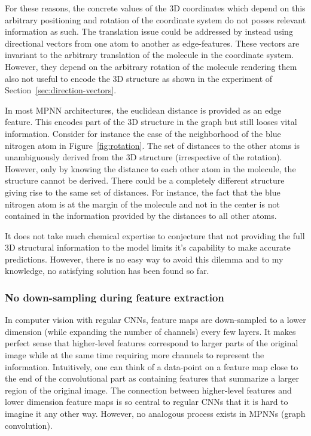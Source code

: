 For these reasons, the concrete values of the 3D coordinates which depend on this arbitrary positioning and rotation of the coordinate system do not posses relevant information as such. The translation issue could be addressed by instead using directional vectors from one atom to another as edge-features. These vectors are invariant to the arbitrary translation of the molecule in the coordinate system. However, they depend on the arbitrary rotation of the molecule rendering them also not useful to encode the 3D structure as shown in the experiment of Section~\ref{sec:direction-vectors}.

In most MPNN architectures, the euclidean distance is provided as an edge feature. This encodes part of the 3D structure in the graph but still looses vital information. Consider for instance the case of the neighborhood of the blue nitrogen atom in Figure~\ref{fig:rotation}. The set of distances to the other atoms is unambiguously derived from the 3D structure (irrespective of the rotation). However, only by knowing the distance to each other atom in the molecule, the structure cannot be derived. There could be a completely different structure giving rise to the same set of distances. For instance, the fact that the blue nitrogen atom is at the margin of the molecule and not in the center is not contained in the information provided by the distances to all other atoms.


It does not take much chemical expertise to conjecture that not providing the full 3D structural information to the model limits it's capability to make accurate predictions. However, there is no easy way to avoid this dilemma and to my knowledge, no satisfying solution has been found so far.

\subsubsection{No down-sampling during feature extraction}

In computer vision with regular CNNs, feature maps are down-sampled to a lower dimension (while expanding the number of channels) every few layers. It makes perfect sense that higher-level features correspond to larger parts of the original image while at the same time requiring more channels to represent the information. Intuitively, one can think of a data-point on a feature map close to the end of the convolutional part as containing features that summarize a larger region of the original image. The connection between higher-level features and lower dimension feature maps is so central to regular CNNs that it is hard to imagine it any other way. However, no analogous process exists in MPNNs (graph convolution).

